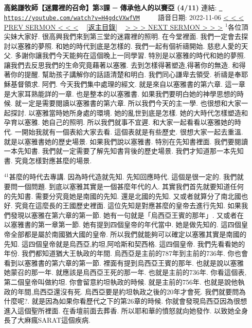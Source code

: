 \documentclass{book}
\begin{document}
\section{}
\label{sec:H4gdcVXwfVM}
\textbf{高銘謙牧師【迷霧裡的召命】第3課 ─ 傳承他人的以賽亞 (4/11)}
\newline
\newline
連結: \href{https://youtube.com/watch?v=H4gdcVXwfVM}{\texttt{ https://youtube.com/watch?v=H4gdcVXwfVM}} ~~~~ 語音日期: 2022-11-06 
\newline
\newline
\hyperref[sec:djNxJ0pc_CU]{\small{< < < PREV SERMON < < <}}
~
\hyperref[sec:index]{\small{[返主目錄]}}
~
\hyperref[sec:gfNxrOBd_U0]{\small{> > > NEXT SERMON > > >}}
\newline
\newline
$^{1}$各位頂尖妹大家好.
很高興我們來到第三堂的迷霧裡的照明.
在今堂裡面.
我們一定會去探討以塞雅的夢照.
和她的時代到底是怎樣的.
我們一起有個祈禱開始.
慈悲人愛的天父.
多謝你讓我們今天能夠在這個晚上一同學習.
特別是以塞雅的時代和她的夢照.
讓我們去反思我們的生命究竟藉著以塞雅.
去到怎樣得著塑造,得著你的無造.
和得著你的提醒.
幫助孩子講解你的話語清楚和明白.
我們同心謙卑去領受.
祈禱是奉耶穌基督領求.
阿們.
今天我們集中處理的經文.
就是來自以塞雅書的第六章.
這一章是大家耳熟能詳的一章.
也是整本的以塞雅書.
如果我們要明白她的神學思想的時候.
就一定是需要閱讀以塞雅書的第六章.
所以我們今天的主一學.
也很想和大家一起探討.
以塞雅當時她所身處的環境.
她的亂世到底是怎樣.
她的大時代怎樣塑造和孕育以塞雅.
她自己的照明.
所以我們就事不宜遲.
和大家一起看看以塞雅她的時代.
一開始我就有一個表給大家去看.
這個表就是有些歷史.
很想大家一起去重溫.
就是以塞雅書她的歷史場景.
如果我們說以塞雅書.
特別在先知書裡面.
我們要閱讀一本先知書.
我們就一定需要了解先知書背後的歷史場景.
我們才知道那一本先知書.
究竟怎樣對應甚麼的場景.

$^{41}$甚麼的時代去專講.
因為時代造就先知.
先知回應時代.
這個是很一定的.
我們就要問一個問題.
到底以塞雅其實是一個甚麼年代的人.
其實我們首先就要知道任何的先知書.
需要分究竟她是南國的先知.
還是北國的先知.
又或者就算分了南北國也好.
究竟在這麼長的王國歷史裡面.
這位先知是對應甚麼的皇帝去進行先知.
如果我們發現以塞雅在第六章的第一節.
她有一句就是「烏西亞王賓的那年」.
又或者在以塞雅書的第一章第一節.
她有提到四個皇帝的年代當中.
她是做先知的.
這四個皇帝全部都是屬於南國猶大國的皇帝.
所以我們就能夠可以確定以塞雅其實是南國的先知.
這四個皇帝就是烏西亞,約坦,阿哈斯和契西格.
這四個皇帝.
我們先看看她的年份.
我們都知道猶大王執政的年間.
烏西亞是主前的787年到主前的736年.
你也會看到以塞雅書的第六章的第一節.
裡面有提到烏西亞王賓的那年.
也就是說以塞雅她蒙召的那一年.
就應該是烏西亞王死的那一年.
也就是主前的736年.
你看這個表,第二個皇帝叫做約坦.
你會留意約坦執政的時候.
就是主前的756年.
也就是說他執政的年間,烏西亞還沒有死.
烏西亞要是約坦執政之後的20年才會死.
我們就要問為什麼呢?.
就是因為如果你看歷代之下的第26章的時候.
你就會發現烏西亞因為很想進入這個聖所裡面.
在香壇前面去葬香.
所以耶和華的憤怒就向她發作.
以致她全身長了大麻瘋SARAT這個疾病.
\end{document}
